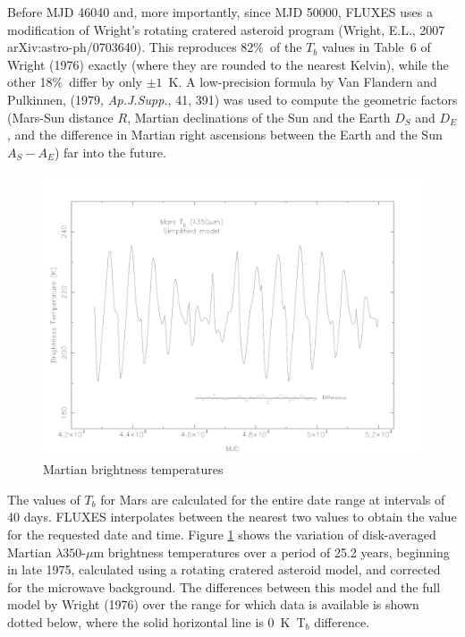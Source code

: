 \documentclass[11pt,twoside]{starlink}
\begin{document}
Before MJD 46040 and, more importantly, since MJD 50000, FLUXES uses a
modification of Wright's rotating cratered asteroid program (Wright,
E.L., 2007 arXiv:astro-ph/0703640). This reproduces
82\%\ of the $T_b$ values in Table~6 of Wright (1976) exactly (where they are
rounded to the nearest Kelvin), while the other 18\%\ differ by only $\pm1$~K.
A low-precision formula by Van Flandern and Pulkinnen,
(1979, \textit{Ap.J.Supp.}, 41, 391)
was used to compute the geometric factors (Mars-Sun
distance $R$, Martian declinations of the Sun and the Earth $D_S$ and $D_E$,
and the difference in Martian right ascensions between the Earth and the Sun
$A_S - A_E$) far into the future.

\begin{figure}[t]
\includegraphics[width=\textwidth]{sun213_fig1}
\vspace*{-0.5cm}
\caption{Martian brightness temperatures}
\label{fig:mars}
\end{figure}

The values of $T_b$ for Mars are calculated for the entire date range
at intervals of 40 days. FLUXES interpolates between the nearest two
values to obtain the value for the requested date and time.
Figure \ref{fig:mars} shows the variation of disk-averaged Martian $\lambda350$-$\mu$m
brightness temperatures over a period of 25.2 years, beginning in late 1975,
calculated using a rotating cratered asteroid model, and corrected for the
microwave background. The differences between this model and the full model
by Wright (1976) over the range for which data is available is shown
dotted below, where the solid horizontal line is 0~K~T$_b$ difference.
\end{document}
